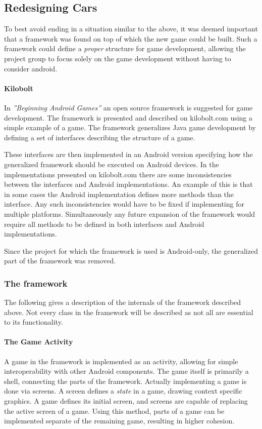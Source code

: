 \subsection{Redesigning Cars}
To best avoid ending in a situation similar to the above, it was deemed important that a framework was found on top of which the new game could be built.
Such a framework could define a \textit{proper} structure for game development, allowing the project group to focus solely on the game development without having to consider android.

\paragraph{Kilobolt}\label{kilobolt:description}
In \textit{''Beginning Android Games''}\cite{androidgames} an open source framework is suggested for game development.
The framework is presented and described on kilobolt.com\cite{kilobolt} using a simple example of a game.
The framework generalizes Java game development by defining a set of interfaces describing the structure of a game.

These interfaces are then implemented in an Android version specifying how the generalized framework should be executed on Android devices.
In the implementations presented on kilobolt.com there are some inconsistencies between the interfaces and Android implementations.
An example of this is that in some cases the Android implementation defines more methods than the interface.
Any such inconsistencies would have to be fixed if implementing for multiple platforms.
Simultaneously any future expansion of the framework would require all methods to be defined in both interfaces and Android implementations. 

Since the project for which the framework is used is Android-only, the generalized part of the framework was removed.

\subsubsection{The framework}
The following gives a description of the internals of the framework described above.
Not every class in the framework will be described as not all are essential to its functionality.

\paragraph{The Game Activity}
A game in the framework is implemented as an activity, allowing for simple interoperability with other Android components.
The game itself is primarily a shell, connecting the parts of the framework.
Actually implementing a game is done via screens.
A screen defines a \textit{state} in a game, drawing context specific graphics.
A game defines its initial screen, and screens are capable of replacing the active screen of a game.
Using this method, parts of a game can be implemented separate of the remaining game, resulting in higher cohesion.

